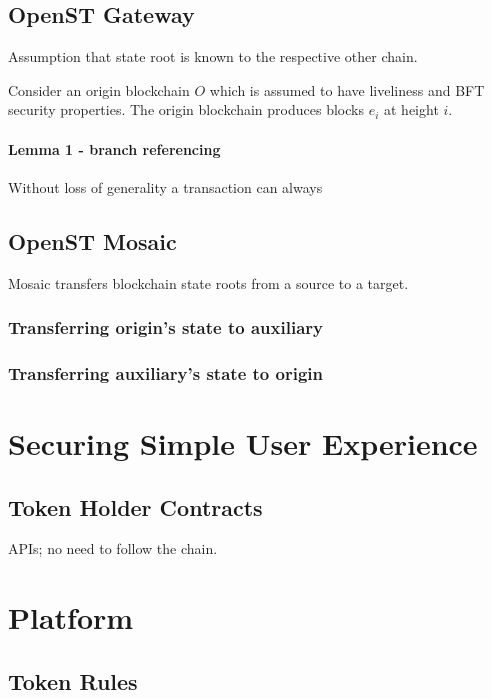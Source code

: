 \documentclass[12pt,a4paper,draft]{article}
\begin{document}
\subsection{OpenST Gateway}

Assumption that state root is known to the respective other chain.

Consider an origin blockchain $O$ which is assumed to have liveliness and BFT security properties.  The origin blockchain produces blocks $e_i$ at height $i$.

\paragraph{Lemma 1 - branch referencing} Without loss of generality a transaction can always 

\subsection{OpenST Mosaic}

Mosaic transfers blockchain state roots from a source to a target.

\subsubsection{Transferring origin's state to auxiliary}

\subsubsection{Transferring auxiliary's state to origin}

\section{Securing Simple User Experience}

\subsection{Token Holder Contracts}

APIs; no need to follow the chain.

\section{Platform}

\subsection{Token Rules}
\end{document}

